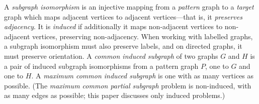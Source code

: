 \documentclass[sigconf]{acmart}
\begin{document}
% 
% 

A \emph{subgraph isomorphism} is an injective mapping from a \emph{pattern} graph to a \emph{target}
graph which maps adjacent vertices to adjacent vertices---that is, it \emph{preserves adjacency}. It
is \emph{induced} if additionally it maps non-adjacent vertices to non-adjacent vertices, preserving
non-adjacency. When working with labelled graphs, a subgraph isomorphism must also preserve labels, and
on directed graphs, it must preserve orientation. A \emph{common induced subgraph} of two graphs $G$
and $H$ is a pair of induced subgraph isomorphisms from a pattern graph $P$, one to $G$ and one to
$H$. A \emph{maximum common induced subgraph} is one with as many vertices as possible. (The
\emph{maximum common partial subgraph} problem is non-induced, with as many edges as
possible; this paper discusses only induced problems.)
\end{document}
